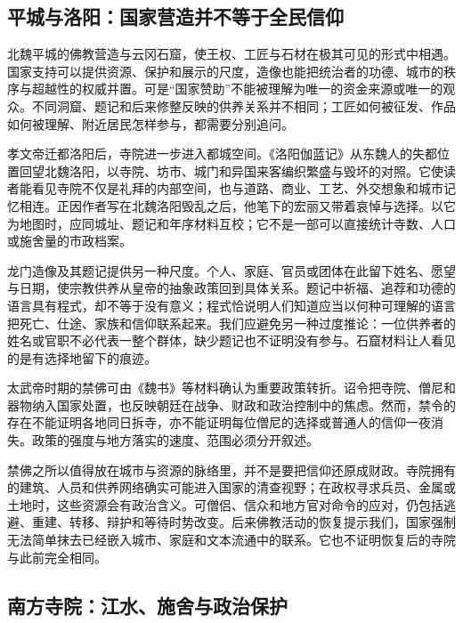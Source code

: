 \subsection{平城与洛阳：国家营造并不等于全民信仰}

北魏平城的佛教营造与云冈石窟，使王权、工匠与石材在极其可见的形式中相遇。国家支持可以提供资源、保护和展示的尺度，造像也能把统治者的功德、城市的秩序与超越性的权威并置。可是“国家赞助”不能被理解为唯一的资金来源或唯一的观众。不同洞窟、题记和后来修整反映的供养关系并不相同；工匠如何被征发、作品如何被理解、附近居民怎样参与，都需要分别追问。

孝文帝迁都洛阳后，寺院进一步进入都城空间。《洛阳伽蓝记》从东魏人的失都位置回望北魏洛阳，以寺院、坊市、城门和异国来客编织繁盛与毁坏的对照。它使读者能看见寺院不仅是礼拜的内部空间，也与道路、商业、工艺、外交想象和城市记忆相连。正因作者写在北魏洛阳毁乱之后，他笔下的宏丽又带着哀悼与选择。以它为地图时，应同城址、题记和年序材料互校；它不是一部可以直接统计寺数、人口或施舍量的市政档案。

龙门造像及其题记提供另一种尺度。个人、家庭、官员或团体在此留下姓名、愿望与日期，使宗教供养从皇帝的抽象政策回到具体关系。题记中祈福、追荐和功德的语言具有程式，却不等于没有意义；程式恰说明人们知道应当以何种可理解的语言把死亡、仕途、家族和信仰联系起来。我们应避免另一种过度推论：一位供养者的姓名或官职不必代表一整个群体，缺少题记也不证明没有参与。石窟材料让人看见的是有选择地留下的痕迹。

\begin{turningpoint}
太武帝时期的禁佛可由《魏书》等材料确认为重要政策转折。诏令把寺院、僧尼和器物纳入国家处置，也反映朝廷在战争、财政和政治控制中的焦虑。然而，禁令的存在不能证明各地同日拆寺，亦不能证明每位僧尼的选择或普通人的信仰一夜消失。政策的强度与地方落实的速度、范围必须分开叙述。
\end{turningpoint}

禁佛之所以值得放在城市与资源的脉络里，并不是要把信仰还原成财政。寺院拥有的建筑、人员和供养网络确实可能进入国家的清查视野；在政权寻求兵员、金属或土地时，这些资源会有政治含义。可僧侣、信众和地方官对命令的应对，仍包括逃避、重建、转移、辩护和等待时势改变。后来佛教活动的恢复提示我们，国家强制无法简单抹去已经嵌入城市、家庭和文本流通中的联系。它也不证明恢复后的寺院与此前完全相同。

\subsection{南方寺院：江水、施舍与政治保护}

